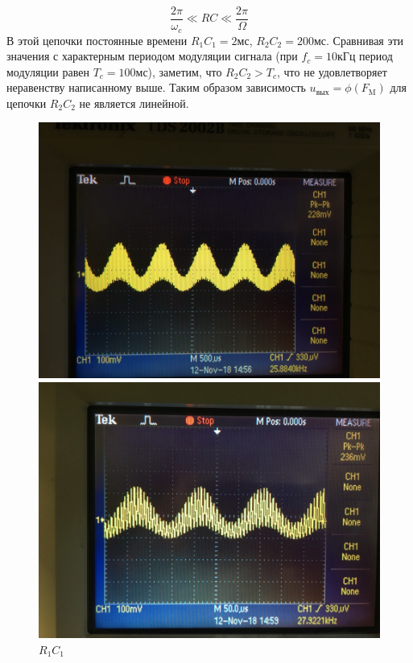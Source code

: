 $$\frac{2\pi}{\omega_c}\ll RC\ll\frac{2\pi}{\Omega}$$
В этой цепочки постоянные времени $R_1C_1=2\text{мс}$, $R_2C_2=200\text{мс}$. Сравнивая эти значения с характерным периодом модуляции сигнала (при $f_c=10\text{кГц}$ период модуляции равен $T_c=100\text{мс}$), заметим, что $R_2C_2>T_c$, что не удовлетворяет неравенству написанному выше. Таким образом зависимость $u_{\text{вых}} = \phi(F_\text{M})$ для цепочки $R_2C_2$ не является линейной.
\begin{figure}[h!]
	\begin{minipage}{0.33\linewidth}
		\centering
		\includegraphics[width=0.9\linewidth]{photo/1kHztau1.jpg}
		\caption*{$R_1C_1$}
	\end{minipage}
	\begin{minipage}{0.33\linewidth}
		\centering
		\includegraphics[width=0.9\linewidth]{photo/7kHztau1.jpg}
		\caption*{$R_1C_1$}
	\end{minipage}

\end{figure}
